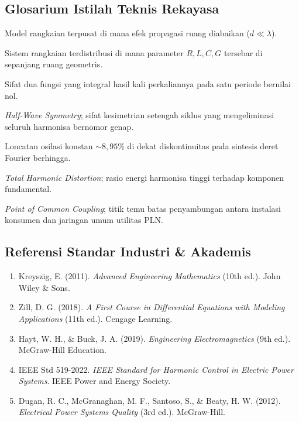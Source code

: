 \documentclass[11pt,a4paper]{article}
\theoremstyle{definition}
\begin{document}
\subsection{Glosarium Istilah Teknis Rekayasa}
\begin{description}[leftmargin=!,labelwidth=3.5cm]
    \item[Lumped Element] Model rangkaian terpusat di mana efek propagasi ruang diabaikan ($d \ll \lambda$).
    \item[Distributed System] Sistem rangkaian terdistribusi di mana parameter $R, L, C, G$ tersebar di sepanjang ruang geometris.
    \item[Orthogonality] Sifat dua fungsi yang integral hasil kali perkaliannya pada satu periode bernilai nol.
    \item[HWS] \textit{Half-Wave Symmetry}; sifat kesimetrian setengah siklus yang mengeliminasi seluruh harmonisa bernomor genap.
    \item[Gibbs Phenomenon] Loncatan osilasi konstan $\sim 8{,}95\%$ di dekat diskontinuitas pada sintesis deret Fourier berhingga.
    \item[THD] \textit{Total Harmonic Distortion}; rasio energi harmonisa tinggi terhadap komponen fundamental.
    \item[PCC] \textit{Point of Common Coupling}; titik temu batas penyambungan antara instalasi konsumen dan jaringan umum utilitas PLN.
\end{description}

\subsection{Referensi Standar Industri \& Akademis}
\begin{enumerate}[leftmargin=*]
    \item Kreyszig, E. (2011). \textit{Advanced Engineering Mathematics} (10th ed.). John Wiley \& Sons.
    \item Zill, D. G. (2018). \textit{A First Course in Differential Equations with Modeling Applications} (11th ed.). Cengage Learning.
    \item Hayt, W. H., \& Buck, J. A. (2019). \textit{Engineering Electromagnetics} (9th ed.). McGraw-Hill Education.
    \item IEEE Std 519-2022. \textit{IEEE Standard for Harmonic Control in Electric Power Systems}. IEEE Power and Energy Society.
    \item Dugan, R. C., McGranaghan, M. F., Santoso, S., \& Beaty, H. W. (2012). \textit{Electrical Power Systems Quality} (3rd ed.). McGraw-Hill.
\end{enumerate}
\end{document}
